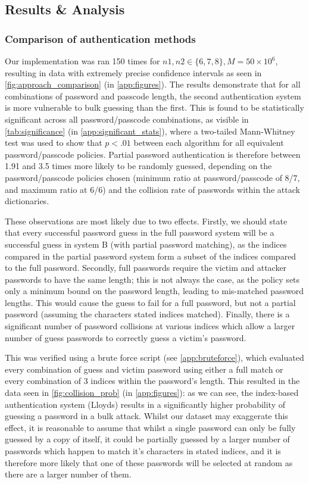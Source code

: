 \documentclass[british,11pt,a4paper]{article}
\begin{document}
\subsection{Results \& Analysis}
\subsubsection{Comparison of authentication methods}
\label{subsec:authentication_methods}
Our implementation was ran 150 times for $n1, n2 \in \{6,7,8\}, M = 50 \times 10^6$, resulting in data with extremely precise confidence intervals as seen in \autoref{fig:approach_comparison} (in \autoref{app:figures}). The results demonstrate that for all combinations of password and passcode length, the second authentication system is more vulnerable to bulk guessing than the first. This is found to be statistically significant across all password/passcode combinations, as visible in \autoref{tab:significance} (in \autoref{app:significant_stats}), where a two-tailed Mann-Whitney test was used to show that $p<.01$ between each algorithm for all equivalent password/passcode policies. Partial password authentication is therefore between 1.91 and 3.5 times more likely to be randomly guessed, depending on the password/passcode policies chosen (minimum ratio at password/passcode of 8/7, and maximum ratio at 6/6) and the collision rate of passwords within the attack dictionaries.

These observations are most likely due to two effects. Firstly, we should state that every successful password guess in the full password system will be a successful guess in system B (with partial password matching), as the indices compared in the partial password system form a subset of the indices compared to the full password. Secondly, full passwords require the victim and attacker passwords to have the same length; this is not always the case, as the policy sets only a minimum bound on the password length, leading to mis-matched password lengths. This would cause the guess to fail for a full password, but not a partial password (assuming the characters stated indices matched). Finally, there is a significant number of password collisions at various indices which allow a larger number of guess passwords to correctly guess a victim's password. 

This was verified using a brute force script (see \autoref{app:bruteforce}), which evaluated every combination of guess and victim password using either a full match or every combination of 3 indices within the password's length. This resulted in the data seen in \autoref{fig:collision_prob} (in \autoref{app:figures}): as we can see, the index-based authentication system (Lloyds) results in a significantly higher probability of guessing a password in a bulk attack. Whilst our dataset may exaggerate this effect, it is reasonable to assume that whilst a single password can only be fully guessed by a copy of itself, it could be partially guessed by a larger number of passwords which happen to match it's characters in stated indices, and it is therefore more likely that one of these passwords will be selected at random as there are a larger number of them. 
\end{document}
